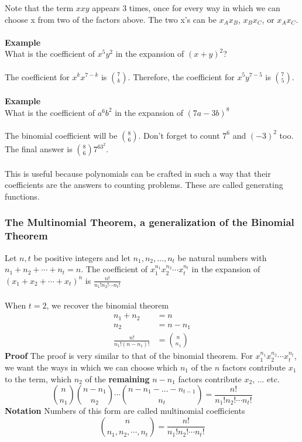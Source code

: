 \documentclass[12pt]{article}
\begin{document}
	Note that the term $xxy$ appears 3 times, once for every way in which we can choose x from two of the factors above. The two x's can be $x_Ax_B$, $x_Bx_C$, or $x_Ax_C$. \\\\
	\textbf{Example}\\
	What is the coefficient of $x^5y^2$ in the expansion of $(x + y)^2$?\\\\
	The coefficient for $x^kx^{7-k}$ is ${7 \choose k}$. Therefore, the coefficient for $x^{5}y^{7-5}$ is ${7 \choose 5}$.\\\\
	\textbf{Example}\\
	What is the coefficient of $a^6b^2$ in the expansion of $(7a-3b)^8$\\\\
	The binomial coefficient will be ${8 \choose 6}$. Don't forget to count $7^6$ and $(-3)^2$ too. The final answer is ${8 \choose 6}7^63^2$. \\\\
	This is useful because polynomials can be crafted in such a way that their coefficients are the answers to counting problems. These are called generating functions.

	\subsubsection{The Multinomial Theorem, a generalization of the Binomial Theorem}
	Let $n, t$ be positive integers and let $n_1, n_2, \ldots, n_t$ be natural numbers with $n_1 + n_2 + \cdots + n_t = n$. The coefficient of $x_1^{n_1}x_2^{n_2} \cdots x_t^{n_t}$ in the expansion of $(x_1 + x_2 + \cdots + x_t)^n$ is $\frac{n!}{n_1!n_2!\cdots n_t!}$ \\\\
	When $t = 2$, we recover the binomial theorem
	\begin{align*}
		n_1 + n_2 &= n \\
		n_2 &= n - n_1 \\
		\frac{n!}{n_1!(n - n_1)!} &= {n \choose n_1}
	\end{align*} 
	\textbf{Proof} 
	The proof is very similar to that of the binomial theorem. For $x_1^{n_1}x_2^{n_2} \cdots x_t^{n_t}$, we want the ways in which we can choose which $n_1$ of the $n$ factors contribute $x_1$ to the term, which $n_2$ of the \textbf{remaining} $n - n_1$ factors contribute $x_2$, ... etc.
	$${n \choose n_1}{n - n_1 \choose n_2}\cdots {n - n_1 - \ldots - n_{t-1} \choose n_t} = \frac{n!}{n_1!n_2!\cdots n_t!}$$
	\textbf{Notation}
	Numbers of this form are called multinomial coefficients
	$${n \choose n_1, n_2, \cdots, n_t} = \frac{n!}{n_1!n_2!\cdots n_t!}$$
\end{document}
